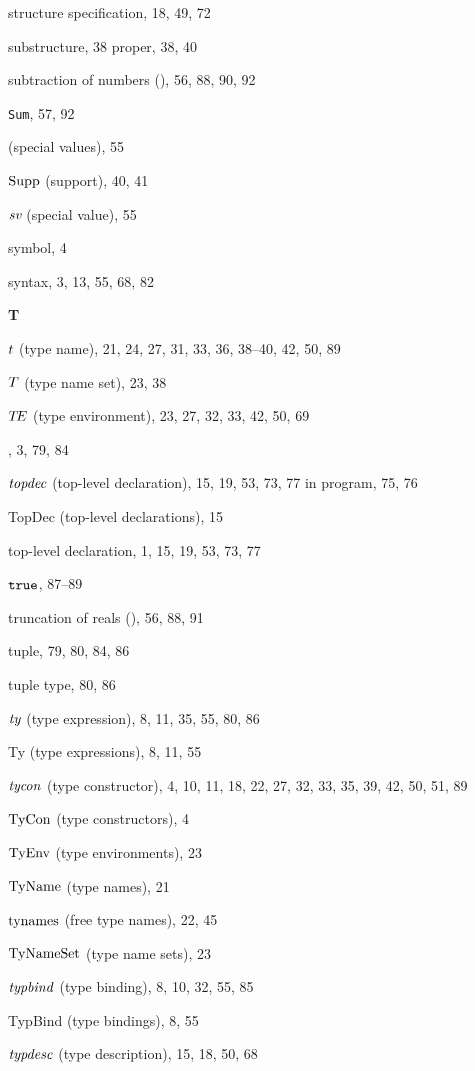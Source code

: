 \begin{theindex}
\item structure specification, 18, 49, 72
\item substructure, 38
\subitem proper, 38, 40
\item subtraction of numbers (\ml{-}), 56, 88, 90, 92
\item {\tt Sum}, 57, 92
\item {\SVal} (special values), 55
\item $\mathop{\rm Supp}\nolimits$ (support), 40, 41
\item $\mbox{\it sv}$ (special value), 55
\item symbol, 4
\item syntax, 3, 13, 55, 68, 82
\indexspace
\parbox{65mm}{\hfil{\large\bf T}\hfil}
\indexspace
\item $t$ (type name), 21, 24, 27, 31, 33, 36, 38--40, 42, 50, 89
\item $T$ (type name set), 23, 38
\item $\mbox{$T\!E$}$ (type environment), 23, 27, 32, 33, 42, 50, 69
\item \THEN, 3, 79, 84
\item ${\it topdec}$ (top-level declaration), 15, 19, 53, 73, 77
\subitem in program, 75, 76
\item TopDec (top-level declarations), 15
\item top-level declaration, 1, 15, 19, 53, 73, 77
\item $\mbox{\tt true}$, 87--89
\item truncation of reals (), 56, 88, 91
\item tuple, 79, 80, 84, 86
\item tuple type, 80, 86
\item ${\it ty}$ (type expression), 8, 11, 35, 55, 80, 86
\item Ty (type expressions), 8, 11, 55
\item ${\it tycon}$ (type constructor), 4, 10, 11, 18, 22, 27, 32, 33, 35, 39, 42, 50, 51, 89
\item ${\rm TyCon}$ (type constructors), 4
\item ${\rm TyEnv}$ (type environments), 23
\item ${\rm TyName}$ (type names), 21
\item $\mathop{\rm tynames}\nolimits$ (free type names), 22, 45
\item ${\rm TyNameSet}$ (type name sets), 23
\item ${\it typbind}$ (type binding), 8, 10, 32, 55, 85
\item TypBind (type bindings), 8, 55
\item ${\it typdesc}$ (type description), 15, 18, 50, 68

\end{theindex}
